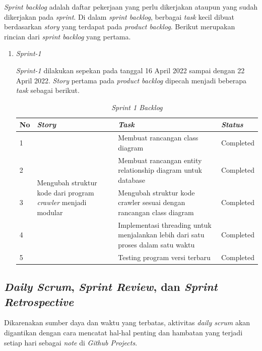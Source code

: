 \textit{Sprint backlog} adalah daftar pekerjaan yang perlu dikerjakan ataupun yang sudah dikerjakan pada \textit{sprint}. Di dalam \textit{sprint backlog}, berbagai \textit{task} kecil dibuat berdasarkan \textit{story} yang terdapat pada \textit{product backlog}. Berikut merupakan rincian dari \textit{sprint backlog} yang pertama.

\begin{enumerate}

	\item{\textit{Sprint-1}}
	
	\textit{Sprint-1} dilakukan sepekan pada tanggal 16 April 2022 sampai dengan 22 April 2022. \textit{Story} pertama pada \textit{product backlog} dipecah menjadi beberapa \textit{task} sebagai berikut.
	
	\begin{table}[H]
	\caption{\textit{Sprint 1 Backlog}}
	\label{sprint1_backlog}
	\begin{tabular}{@{} |p{0.5cm}|p{5cm}|p{5cm}|p{2cm}| @{}}
		\hline
		\textbf{No} & \textbf{\textit{Story}} & \textbf{\textit{Task}} & \textbf{\textit{Status}} \\
		\hline
		1 & \multirow{13}{5cm}{Mengubah struktur kode dari program \textit{crawler} menjadi modular} & Membuat rancangan class diagram & Completed\\
		\cline{1-1}\cline{3-4}
		2 & & Membuat rancangan entity relationship diagram untuk database & Completed\\
		\cline{1-1}\cline{3-4}
		3 & & Mengubah struktur kode crawler sesuai dengan rancangan class diagram & Completed\\
		\cline{1-1}\cline{3-4}
		4 & & Implementasi threading untuk menjalankan lebih dari satu proses dalam satu waktu & Completed\\
		\cline{1-1}\cline{3-4}
		5 & & Testing program versi terbaru & Completed\\
		\hline
	\end{tabular}
	\end{table}
	
\end{enumerate}

\subsection{\textit{Daily Scrum}, \textit{Sprint Review}, dan \textit{Sprint Retrospective}}

Dikarenakan sumber daya dan waktu yang terbatas, aktivitas \textit{daily scrum} akan digantikan dengan cara mencatat hal-hal penting dan hambatan yang terjadi setiap hari sebagai \textit{note} di \textit{Github Projects}.


